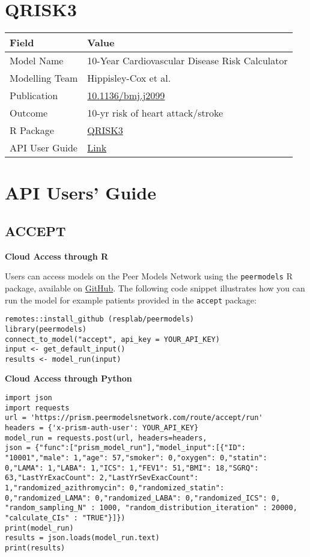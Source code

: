 \documentclass[
]{book}
\begin{document}
\hypertarget{qrisk3}{%
\chapter{QRISK3}\label{qrisk3}}

\begin{longtable}[]{@{}ll@{}}
\toprule
Field & Value\tabularnewline
\midrule
\endhead
Model Name & 10-Year Cardiovascular Disease Risk Calculator\tabularnewline
Modelling Team & Hippisley-Cox et al.\tabularnewline
Publication & \href{https://doi.org/10.1136/bmj.j2099}{10.1136/bmj.j2099}\tabularnewline
Outcome & 10-yr risk of heart attack/stroke\tabularnewline
R Package & \href{https://cran.r-project.org/package=QRISK3}{QRISK3}\tabularnewline
API User Guide & \href{https://resplab.github.io/prismguide/api-users-guide.html\#qrisk3-1}{Link}\tabularnewline
\bottomrule
\end{longtable}

\hypertarget{api-users-guide}{%
\chapter{API Users' Guide}\label{api-users-guide}}

\hypertarget{accept}{%
\section{ACCEPT}\label{accept}}

\textbf{Cloud Access through R}

Users can access models on the Peer Models Network using the \texttt{peermodels} R package, available on \href{https://github.com/resplab/peermodels}{GitHub}. The following code snippet illustrates how you can run the model for example patients provided in the \texttt{accept} package:

\begin{verbatim}
remotes::install_github (resplab/peermodels)
library(peermodels)
connect_to_model("accept", api_key = YOUR_API_KEY)
input <- get_default_input()
results <- model_run(input)
\end{verbatim}

\textbf{Cloud Access through Python}

\begin{verbatim}
import json
import requests
url = 'https://prism.peermodelsnetwork.com/route/accept/run'
headers = {'x-prism-auth-user': YOUR_API_KEY}
model_run = requests.post(url, headers=headers,
json = {"func":["prism_model_run"],"model_input":[{"ID": "10001","male": 1,"age": 57,"smoker": 0,"oxygen": 0,"statin": 0,"LAMA": 1,"LABA": 1,"ICS": 1,"FEV1": 51,"BMI": 18,"SGRQ": 63,"LastYrExacCount": 2,"LastYrSevExacCount": 1,"randomized_azithromycin": 0,"randomized_statin": 0,"randomized_LAMA": 0,"randomized_LABA": 0,"randomized_ICS": 0, "random_sampling_N" : 1000, "random_distribution_iteration" : 20000, "calculate_CIs" : "TRUE"}]})
print(model_run)
results = json.loads(model_run.text)
print(results)
\end{verbatim}
\end{document}
